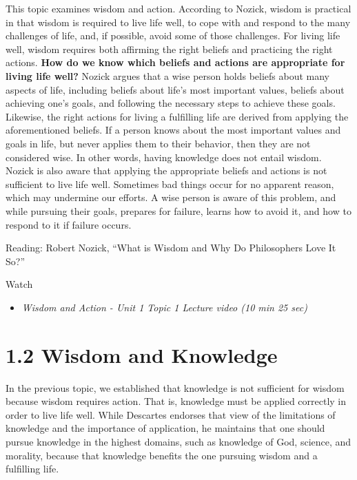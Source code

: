 \documentclass[
]{book}
\providecommand{\tightlist}{%
  \setlength{\itemsep}{0pt}\setlength{\parskip}{0pt}}
\begin{document}
This topic examines wisdom and action. According to Nozick, wisdom is practical in that wisdom is required to live life well, to cope with and respond to the many challenges of life, and, if possible, avoid some of those challenges. For living life well, wisdom requires both affirming the right beliefs and practicing the right actions. \textbf{How do we know which beliefs and actions are appropriate for living life well?} Nozick argues that a wise person holds beliefs about many aspects of life, including beliefs about life's most important values, beliefs about achieving one's goals, and following the necessary steps to achieve these goals. Likewise, the right actions for living a fulfilling life are derived from applying the aforementioned beliefs. If a person knows about the most important values and goals in life, but never applies them to their behavior, then they are not considered wise. In other words, having knowledge does not entail wisdom. Nozick is also aware that applying the appropriate beliefs and actions is not sufficient to live life well. Sometimes bad things occur for no apparent reason, which may undermine our efforts. A wise person is aware of this problem, and while pursuing their goals, prepares for failure, learns how to avoid it, and how to respond to it if failure occurs.

Reading: Robert Nozick, ``What is Wisdom and Why Do Philosophers Love It So?''

Watch

\begin{itemize}
\tightlist
\item
  \emph{Wisdom and Action - Unit 1 Topic 1 Lecture video (10 min 25 sec)}
\end{itemize}

\hypertarget{wisdom-and-knowledge}{%
\section*{1.2 Wisdom and Knowledge}\label{wisdom-and-knowledge}}

In the previous topic, we established that knowledge is not sufficient for wisdom because wisdom requires action. That is, knowledge must be applied correctly in order to live life well. While Descartes endorses that view of the limitations of knowledge and the importance of application, he maintains that one should pursue knowledge in the highest domains, such as knowledge of God, science, and morality, because that knowledge benefits the one pursuing wisdom and a fulfilling life.
\end{document}
